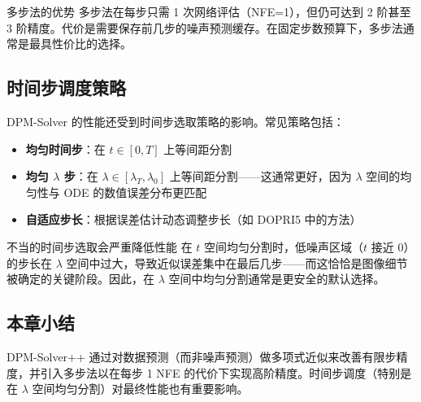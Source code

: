 \begin{importantbox}{多步法的优势}
多步法在每步只需 1 次网络评估（NFE=1），但仍可达到 2 阶甚至 3 阶精度。代价是需要保存前几步的噪声预测缓存。在固定步数预算下，多步法通常是最具性价比的选择。
\end{importantbox}

\subsection{时间步调度策略}

DPM-Solver 的性能还受到时间步选取策略的影响。常见策略包括：

\begin{itemize}
    \item \textbf{均匀时间步}：在 $t \in [0, T]$ 上等间距分割
    \item \textbf{均匀 $\lambda$ 步}：在 $\lambda \in [\lambda_T, \lambda_0]$ 上等间距分割——这通常更好，因为 $\lambda$ 空间的均匀性与 ODE 的数值误差分布更匹配
    \item \textbf{自适应步长}：根据误差估计动态调整步长（如 DOPRI5 中的方法）
\end{itemize}

\begin{warningbox}{不当的时间步选取会严重降低性能}
在 $t$ 空间均匀分割时，低噪声区域（$t$ 接近 0）的步长在 $\lambda$ 空间中过大，导致近似误差集中在最后几步——而这恰恰是图像细节被确定的关键阶段。因此，在 $\lambda$ 空间中均匀分割通常是更安全的默认选择。
\end{warningbox}

\subsection{本章小结}

DPM-Solver++ 通过对数据预测（而非噪声预测）做多项式近似来改善有限步精度，并引入多步法以在每步 1 NFE 的代价下实现高阶精度。时间步调度（特别是在 $\lambda$ 空间均匀分割）对最终性能也有重要影响。


